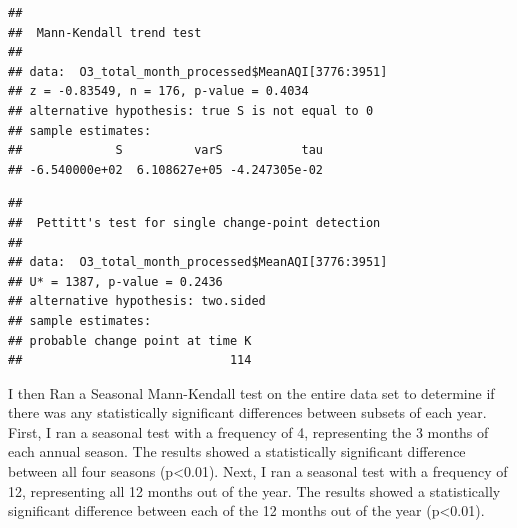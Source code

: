 \documentclass[12pt,]{article}
\newenvironment{Shaded}{\begin{snugshade}}{\end{snugshade}}
\newcommand{\KeywordTok}[1]{\textcolor[rgb]{0.13,0.29,0.53}{\textbf{#1}}}
\newcommand{\DataTypeTok}[1]{\textcolor[rgb]{0.13,0.29,0.53}{#1}}
\newcommand{\DecValTok}[1]{\textcolor[rgb]{0.00,0.00,0.81}{#1}}
\newcommand{\StringTok}[1]{\textcolor[rgb]{0.31,0.60,0.02}{#1}}
\newcommand{\CommentTok}[1]{\textcolor[rgb]{0.56,0.35,0.01}{\textit{#1}}}
\newcommand{\OperatorTok}[1]{\textcolor[rgb]{0.81,0.36,0.00}{\textbf{#1}}}
\newcommand{\NormalTok}[1]{#1}
\begin{document}
\begin{verbatim}
## 
##  Mann-Kendall trend test
## 
## data:  O3_total_month_processed$MeanAQI[3776:3951]
## z = -0.83549, n = 176, p-value = 0.4034
## alternative hypothesis: true S is not equal to 0
## sample estimates:
##             S          varS           tau 
## -6.540000e+02  6.108627e+05 -4.247305e-02
\end{verbatim}

\begin{Shaded}
\end{Shaded}

\begin{verbatim}
## 
##  Pettitt's test for single change-point detection
## 
## data:  O3_total_month_processed$MeanAQI[3776:3951]
## U* = 1387, p-value = 0.2436
## alternative hypothesis: two.sided
## sample estimates:
## probable change point at time K 
##                             114
\end{verbatim}

I then Ran a Seasonal Mann-Kendall test on the entire data set to
determine if there was any statistically significant differences between
subsets of each year. First, I ran a seasonal test with a frequency of
4, representing the 3 months of each annual season. The results showed a
statistically significant difference between all four seasons
(p\textless{}0.01). Next, I ran a seasonal test with a frequency of 12,
representing all 12 months out of the year. The results showed a
statistically significant difference between each of the 12 months out
of the year (p\textless{}0.01).

\begin{Shaded}
\end{Shaded}
\end{document}
